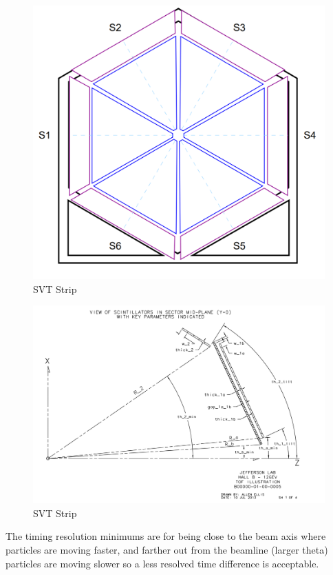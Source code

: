             									
			 \begin{figure}[H]
    			\centering
    			\includegraphics[width=12cm]{CLAS-12/modules/clas-12-system/pics/fd/ftof-front.PNG}
    			\caption{SVT Strip}
			\end{figure}

		
			 \begin{figure}[H]
    			\centering
    			\includegraphics[width=12cm]{CLAS-12/modules/clas-12-system/pics/fd/clas12-ftof-geom.PNG}
    			\caption{SVT Strip}
			\end{figure}
			
			
            
            The timing resolution minimums are for being close to the beam axis where particles are moving faster, and farther out from the beamline (larger theta) particles are moving slower so a less resolved time difference is acceptable. 
            
